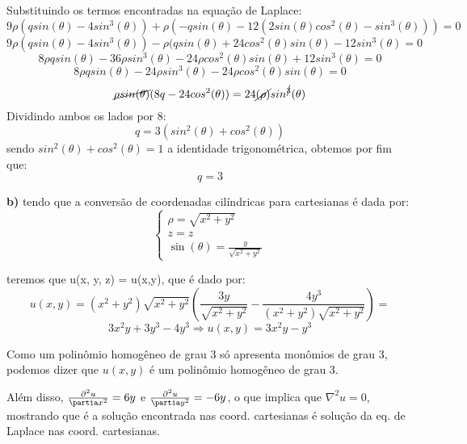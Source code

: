 Substituindo os termos encontradas na equação de Laplace:
\begin{equation*}
    9\rho(qsin(\theta) - 4sin^3(\theta)) + \rho(-qsin(\theta) - 12(2sin(\theta)cos^2(\theta) -sin^3(\theta))) = 0
\end{equation*}
\begin{equation*}
    9\rho(qsin(\theta) - 4sin^3(\theta)) -\rho(qsin(\theta) + 24cos^2(\theta)sin(\theta) - 12sin^3(\theta) = 0
\end{equation*}
\begin{equation*}
    8\rho q sin(\theta) - 36\rho sin^3(\theta) -24\rho cos^2(\theta)sin(\theta) + 12sin^3(\theta) = 0
\end{equation*}
\begin{equation*}
    8\rho q sin(\theta) - 24\rho sin^3(\theta) -24\rho cos^2(\theta)sin(\theta) = 0
\end{equation*}
\begin{equation*}
    \cancel{\rho sin(\theta)}(8q - 24cos^2(\theta)) = 24
    \cancel{(\rho)}sin^{\cancel{3}}(\theta) 
\end{equation*}
Dividindo ambos os lados por $8$:
\begin{equation*}
    q = 3(sin^2(\theta) + cos^2(\theta))
\end{equation*}
sendo $sin^2(\theta) + cos^2(\theta) = 1$ a identidade trigonométrica, obtemos por fim que:
\begin{equation*}
    \boxed{q=3}
\end{equation*}

\textbf{b)}
tendo que a conversão de coordenadas cilíndricas para cartesianas é dada por:
\begin{equation*}
    \begin{cases}
        \rho = \sqrt{x^2+y^2}\\
        z=z\\
        \sin(\theta) = \frac{y}{\sqrt{x^2+y^2}}
    \end{cases}
\end{equation*}

teremos que u(x, y, z) = u(x,y), que é dado por:
\begin{equation*}
    u(x,y) = (x^2+y^2)\sqrt{x^2+y^2}\left(\frac{3y}{\sqrt{x^2+y^2}} - \frac{4y^3}{(x^2+y^2)\sqrt{x^2+y^2}}\right) = 
\end{equation*}
\begin{equation*}
    3x^2y + 3y^3 - 4y^3 \Rightarrow \boxed{u(x,y) = 3x^2y - y^3}
\end{equation*}


Como um polinômio homogêneo de grau 3 só apresenta monômios de grau 3, podemos dizer que $u(x,y)$ é um polinômio homogêneo de grau 3.

Além disso, $\frac{\partial^2 u}{\partia x^2} = 6y$ e $\frac{\partial^2 u}{\partia y^2} = -6y$, o que implica que $\nabla^2 u = 0$, mostrando que é a solução encontrada nas coord. cartesianas é solução da eq. de Laplace nas coord. cartesianas.